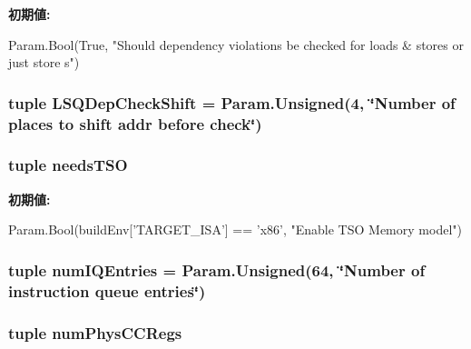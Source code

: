 \label{classO3CPU_1_1DerivO3CPU_a3859ad14dd72838e8cd3c5586a575f39}
{\bfseries 初期値:}
\begin{DoxyCode}
Param.Bool(True,
        "Should dependency violations be checked for loads & stores or just store
      s")
\end{DoxyCode}
\hypertarget{classO3CPU_1_1DerivO3CPU_a1b3d69c0417f81ea9f80c896fe699060}{
\subsubsection[{LSQDepCheckShift}]{\setlength{\rightskip}{0pt plus 5cm}tuple {\bf LSQDepCheckShift} = Param.Unsigned(4, \char`\"{}Number of places to shift addr before check\char`\"{})}}
\label{classO3CPU_1_1DerivO3CPU_a1b3d69c0417f81ea9f80c896fe699060}
\hypertarget{classO3CPU_1_1DerivO3CPU_a0a878d111d7f807d12573f1d0305f7cc}{
\subsubsection[{needsTSO}]{\setlength{\rightskip}{0pt plus 5cm}tuple {\bf needsTSO}}}
\label{classO3CPU_1_1DerivO3CPU_a0a878d111d7f807d12573f1d0305f7cc}
{\bfseries 初期値:}
\begin{DoxyCode}
Param.Bool(buildEnv['TARGET_ISA'] == 'x86',
                          "Enable TSO Memory model")
\end{DoxyCode}
\hypertarget{classO3CPU_1_1DerivO3CPU_a008b4cba2a3f283c5889144437338721}{
\subsubsection[{numIQEntries}]{\setlength{\rightskip}{0pt plus 5cm}tuple {\bf numIQEntries} = Param.Unsigned(64, \char`\"{}Number of instruction queue entries\char`\"{})}}
\label{classO3CPU_1_1DerivO3CPU_a008b4cba2a3f283c5889144437338721}
\hypertarget{classO3CPU_1_1DerivO3CPU_aae7d8cb15fc97d48c864e92f858edece}{
\subsubsection[{numPhysCCRegs}]{\setlength{\rightskip}{0pt plus 5cm}tuple {\bf numPhysCCRegs}}}
